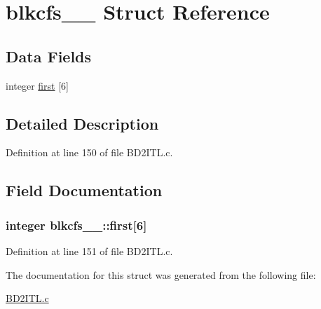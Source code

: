 \hypertarget{structblkcfs__1__}{}\section{blkcfs\+\_\+\_\+ Struct Reference}
\label{structblkcfs__1__}
\subsection*{Data Fields}
\begin{DoxyCompactItemize}
\item 
integer \hyperlink{structblkcfs__1___a6f4077618a2b162c0b525cf6a03277fe}{first} \mbox{[}6\mbox{]}
\end{DoxyCompactItemize}


\subsection{Detailed Description}


Definition at line 150 of file B\+D2\+I\+T\+L.\+c.



\subsection{Field Documentation}
\subsubsection[{\texorpdfstring{first}{first}}]{\setlength{\rightskip}{0pt plus 5cm}integer blkcfs\+\_\+\_\+\+::first\mbox{[}6\mbox{]}}\hypertarget{structblkcfs__1___a6f4077618a2b162c0b525cf6a03277fe}{}\label{structblkcfs__1___a6f4077618a2b162c0b525cf6a03277fe}


Definition at line 151 of file B\+D2\+I\+T\+L.\+c.



The documentation for this struct was generated from the following file\+:\begin{DoxyCompactItemize}
\item 
\hyperlink{BD2ITL_8c}{B\+D2\+I\+T\+L.\+c}\end{DoxyCompactItemize}
